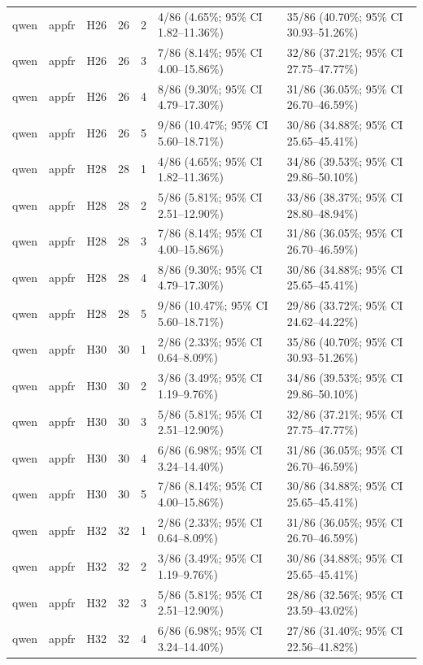 \begin{longtable}{lllrrll}
qwen & appfr & H26 & 26 & 2 & 4/86 (4.65\%; 95\% CI 1.82–11.36\%) & 35/86 (40.70\%; 95\% CI 30.93–51.26\%) \\
qwen & appfr & H26 & 26 & 3 & 7/86 (8.14\%; 95\% CI 4.00–15.86\%) & 32/86 (37.21\%; 95\% CI 27.75–47.77\%) \\
qwen & appfr & H26 & 26 & 4 & 8/86 (9.30\%; 95\% CI 4.79–17.30\%) & 31/86 (36.05\%; 95\% CI 26.70–46.59\%) \\
qwen & appfr & H26 & 26 & 5 & 9/86 (10.47\%; 95\% CI 5.60–18.71\%) & 30/86 (34.88\%; 95\% CI 25.65–45.41\%) \\
qwen & appfr & H28 & 28 & 1 & 4/86 (4.65\%; 95\% CI 1.82–11.36\%) & 34/86 (39.53\%; 95\% CI 29.86–50.10\%) \\
qwen & appfr & H28 & 28 & 2 & 5/86 (5.81\%; 95\% CI 2.51–12.90\%) & 33/86 (38.37\%; 95\% CI 28.80–48.94\%) \\
qwen & appfr & H28 & 28 & 3 & 7/86 (8.14\%; 95\% CI 4.00–15.86\%) & 31/86 (36.05\%; 95\% CI 26.70–46.59\%) \\
qwen & appfr & H28 & 28 & 4 & 8/86 (9.30\%; 95\% CI 4.79–17.30\%) & 30/86 (34.88\%; 95\% CI 25.65–45.41\%) \\
qwen & appfr & H28 & 28 & 5 & 9/86 (10.47\%; 95\% CI 5.60–18.71\%) & 29/86 (33.72\%; 95\% CI 24.62–44.22\%) \\
qwen & appfr & H30 & 30 & 1 & 2/86 (2.33\%; 95\% CI 0.64–8.09\%) & 35/86 (40.70\%; 95\% CI 30.93–51.26\%) \\
qwen & appfr & H30 & 30 & 2 & 3/86 (3.49\%; 95\% CI 1.19–9.76\%) & 34/86 (39.53\%; 95\% CI 29.86–50.10\%) \\
qwen & appfr & H30 & 30 & 3 & 5/86 (5.81\%; 95\% CI 2.51–12.90\%) & 32/86 (37.21\%; 95\% CI 27.75–47.77\%) \\
qwen & appfr & H30 & 30 & 4 & 6/86 (6.98\%; 95\% CI 3.24–14.40\%) & 31/86 (36.05\%; 95\% CI 26.70–46.59\%) \\
qwen & appfr & H30 & 30 & 5 & 7/86 (8.14\%; 95\% CI 4.00–15.86\%) & 30/86 (34.88\%; 95\% CI 25.65–45.41\%) \\
qwen & appfr & H32 & 32 & 1 & 2/86 (2.33\%; 95\% CI 0.64–8.09\%) & 31/86 (36.05\%; 95\% CI 26.70–46.59\%) \\
qwen & appfr & H32 & 32 & 2 & 3/86 (3.49\%; 95\% CI 1.19–9.76\%) & 30/86 (34.88\%; 95\% CI 25.65–45.41\%) \\
qwen & appfr & H32 & 32 & 3 & 5/86 (5.81\%; 95\% CI 2.51–12.90\%) & 28/86 (32.56\%; 95\% CI 23.59–43.02\%) \\
qwen & appfr & H32 & 32 & 4 & 6/86 (6.98\%; 95\% CI 3.24–14.40\%) & 27/86 (31.40\%; 95\% CI 22.56–41.82\%) \\

\end{longtable}
